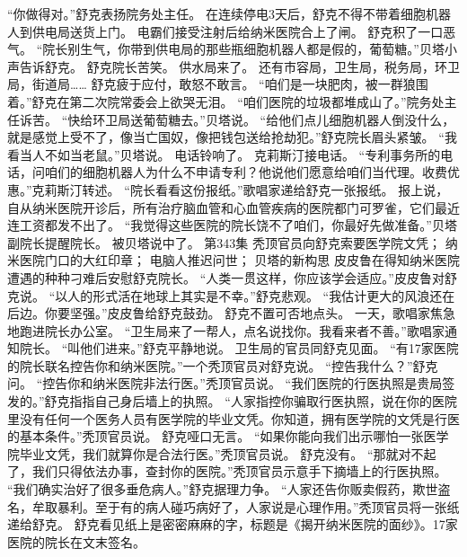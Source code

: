 \documentclass[a4paper,12pt,UTF8,twoside]{ctexbook}
\begin{document}
        “你做得对。”舒克表扬院务处主任。  
        在连续停电3天后，舒克不得不带着细胞机器人到供电局送货上门。  
        电霸们接受注射后给纳米医院合上了闸。  
        舒克积了一口恶气。  
        “院长别生气，你带到供电局的那些瓶细胞机器人都是假的，葡萄糖。”贝塔小声告诉舒克。  
        舒克院长苦笑。  
        供水局来了。  
        还有市容局，卫生局，税务局，环卫局，街道局……  
        舒克疲于应付，敢怒不敢言。  
        “咱们是一块肥肉，被一群狼围着。”舒克在第二次院常委会上欲哭无泪。  
        “咱们医院的垃圾都堆成山了。”院务处主任诉苦。  
        “快给环卫局送葡萄糖去。”贝塔说。  
        “给他们点儿细胞机器人倒没什么，就是感觉上受不了，像当亡国奴，像把钱包送给抢劫犯。”舒克院长眉头紧皱。  
        “我看当人不如当老鼠。”贝塔说。  
        电话铃响了。  
        克莉斯汀接电话。  
        “专利事务所的电话，问咱们的细胞机器人为什么不申请专利？他说他们愿意给咱们当代理。收费优惠。”克莉斯汀转述。  
        “院长看看这份报纸。”歌唱家递给舒克一张报纸。  
        报上说，自从纳米医院开诊后，所有治疗脑血管和心血管疾病的医院都门可罗雀，它们最近连工资都发不出了。  
        “我觉得这些医院的院长饶不了咱们，你最好先做准备。”贝塔副院长提醒院长。  
        被贝塔说中了。          第343集  
        秃顶官员向舒克索要医学院文凭；  
        纳米医院门口的大红印章；  
        电脑人推迟问世；  
        贝塔的新构思    
        皮皮鲁在得知纳米医院遭遇的种种刁难后安慰舒克院长。  
        “人类一贯这样，你应该学会适应。”皮皮鲁对舒克说。  
        “以人的形式活在地球上其实是不幸。”舒克悲观。  
        “我估计更大的风浪还在后边。你要坚强。”皮皮鲁给舒克鼓劲。  
        舒克不置可否地点头。  
        一天，歌唱家焦急地跑进院长办公室。  
        “卫生局来了一帮人，点名说找你。我看来者不善。”歌唱家通知院长。  
        “叫他们进来。”舒克平静地说。  
        卫生局的官员同舒克见面。  
        “有17家医院的院长联名控告你和纳米医院。”一个秃顶官员对舒克说。  
        “控告我什么？”舒克问。  
        “控告你和纳米医院非法行医。”秃顶官员说。  
        “我们医院的行医执照是贵局签发的。”舒克指指自己身后墙上的执照。  
        “人家指控你骗取行医执照，说在你的医院里没有任何一个医务人员有医学院的毕业文凭。你知道，拥有医学院的文凭是行医的基本条件。”秃顶官员说。  
        舒克哑口无言。  
        “如果你能向我们出示哪怕一张医学院毕业文凭，我们就算你是合法行医。”秃顶官员说。  
        舒克没有。  
        “那就对不起了，我们只得依法办事，查封你的医院。”秃顶官员示意手下摘墙上的行医执照。  
        “我们确实治好了很多垂危病人。”舒克据理力争。  
        “人家还告你贩卖假药，欺世盗名，牟取暴利。至于有的病人碰巧病好了，人家说是心理作用。”秃顶官员将一张纸递给舒克。        
        舒克看见纸上是密密麻麻的字，标题是《揭开纳米医院的面纱》。17家医院的院长在文末签名。  
\end{document}
